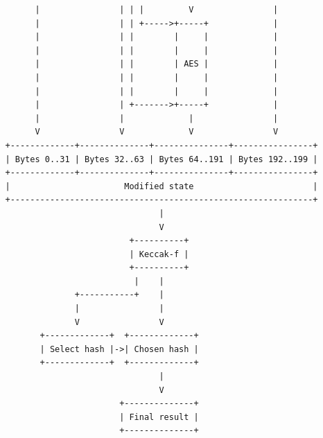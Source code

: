 \begin{verbatim}
         |                | | |         V                |
         |                | | +----->+-----+             |
         |                | |        |     |             |
         |                | |        |     |             |
         |                | |        | AES |             |
         |                | |        |     |             |
         |                | |        |     |             |
         |                | +------->+-----+             |
         |                |             |                |
         V                V             V                V
   +-------------+--------------+---------------+----------------+
   | Bytes 0..31 | Bytes 32..63 | Bytes 64..191 | Bytes 192..199 |
   +-------------+--------------+---------------+----------------+
   |                       Modified state                        |
   +-------------------------------------------------------------+
                                  |
                                  V
                            +----------+
                            | Keccak-f |
                            +----------+
                             |    |
                 +-----------+    |
                 |                |
                 V                V
          +-------------+  +-------------+
          | Select hash |->| Chosen hash |
          +-------------+  +-------------+
                                  |
                                  V
                          +--------------+
                          | Final result |
                          +--------------+
\end{verbatim}